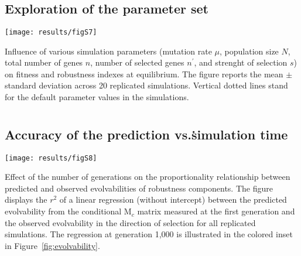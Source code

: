 \documentclass[10pt,a4paper]{article}
\newcommand{\M}{\bm{\mathrm M}}
\begin{document}
\begin{appendices}
  \clearpage
  \section{}
    \label{supp:explo}
    \subsection*{Exploration of the parameter set}
	\begin{adjustwidth}{-1in}{0in}
	\texttt{[image: results/figS7]} 
	
	{\color{Gray}Influence of various simulation parameters (mutation rate $\mu$, population size $N$, total number of genes $n$, number of selected genes $n^\prime$, and strenght of selection $s$) on fitness and robustness indexes at equilibrium. The figure reports the mean $\pm$ standard deviation across 20 replicated simulations. Vertical dotted lines stand for the default parameter values in the simulations. }
	\end{adjustwidth}


	
  \clearpage
  \section{}
    \label{supp:r2evolv}
    \subsection*{Accuracy of the prediction vs.\.simulation time}
	\begin{center}
	\texttt{[image: results/figS8]} 
	\end{center}
	
	{\color{Gray} Effect of the number of generations on the proportionality relationship between predicted and observed evolvabilities of robustness components. The figure displays the $r^2$ of a linear regression (without intercept) between the predicted evolvability from the conditional $\M_c$ matrix measured at the first generation and the observed evolvability in the direction of selection for all replicated simulations. The regression at generation 1,000 is illustrated in the colored inset in Figure~\ref{fig:evolvability}. }



  \clearpage
  \section{}
    \label{supp:evolcor}

\end{appendices}
\end{document}
